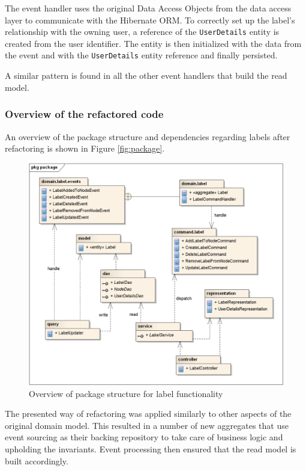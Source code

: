 \documentclass{book}
\begin{document}
The event handler uses the original Data Access Objects from the data
access layer to communicate with the Hibernate ORM. To correctly set up
the label's relationship with the owning user, a reference of the
\texttt{UserDetails} entity is created from the user identifier. The
entity is then initialized with the data from the event and with the
\texttt{UserDetails} entity reference and finally persisted.

A similar pattern is found in all the other event handlers that build
the read model.


\subsubsection{Overview of the refactored
code}\label{overview-of-the-refactored-code}

An overview of the package structure and dependencies regarding labels
after refactoring is shown in Figure \ref{fig:package}.


\begin{figure}[h!]
\begin{center}
\includegraphics[width=0.98\columnwidth]{figures/package/package}
\caption{Overview of package structure for label functionality%
}
\end{center}
\end{figure}

The presented way of refactoring was applied similarly to other aspects
of the original domain model. This resulted in a number of new
aggregates that use event sourcing as their backing repository to take
care of business logic and upholding the invariants. Event processing
then ensured that the read model is built accordingly.
\end{document}
